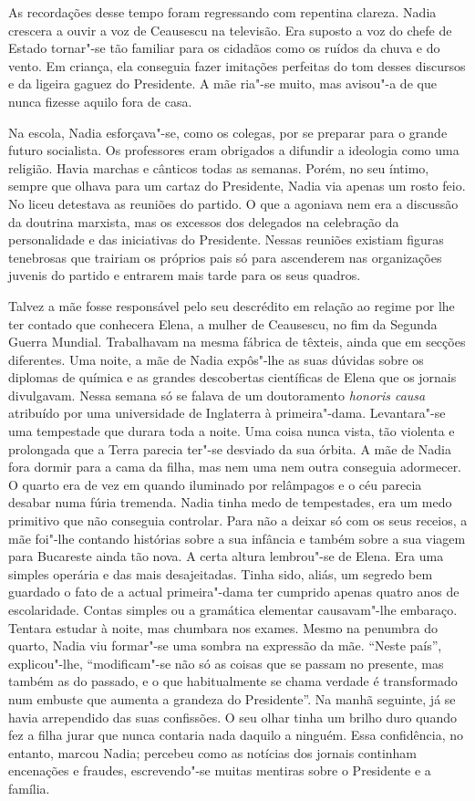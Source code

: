 As recordações desse tempo foram regressando com
repentina clareza. Nadia crescera a ouvir a voz de Ceausescu na
televisão. Era suposto a voz do chefe de Estado tornar"-se tão familiar
para os cidadãos como os ruídos da chuva e do vento. Em criança, ela
conseguia fazer imitações perfeitas do tom desses discursos e da
ligeira gaguez
do Presidente. A mãe ria"-se muito, mas avisou"-a de que nunca fizesse
aquilo fora de casa.

Na escola, Nadia esforçava"-se, como os colegas, por se preparar para o
grande futuro socialista. Os professores eram obrigados a difundir a
ideologia como uma religião. Havia marchas e cânticos todas as semanas.
Porém, no seu íntimo, sempre que olhava para um cartaz do Presidente,
Nadia via apenas um rosto feio. No liceu detestava as reuniões do
partido. O que a agoniava nem era a discussão da doutrina marxista, mas
os excessos dos delegados na celebração da personalidade e das
iniciativas do Presidente. Nessas reuniões existiam figuras tenebrosas
que trairiam os próprios pais só para ascenderem nas organizações
juvenis do partido e entrarem mais tarde para os seus quadros.

Talvez a mãe fosse responsável pelo seu descrédito em relação ao regime
por lhe ter contado que conhecera Elena, a mulher de Ceausescu, no fim
da Segunda Guerra Mundial. Trabalhavam na mesma fábrica de têxteis,
ainda que em secções diferentes. Uma noite, a mãe de Nadia expôs"-lhe as
suas dúvidas sobre os diplomas de química e as grandes descobertas
científicas de Elena que os jornais divulgavam. Nessa semana só se
falava de um doutoramento \emph{honoris causa} atribuído por uma universidade de Inglaterra à
primeira"-dama. Levantara"-se uma tempestade que durara toda a noite. Uma
coisa nunca vista, tão violenta e prolongada que a Terra parecia
ter"-se desviado da sua órbita. A mãe de Nadia fora dormir para a cama da
filha, mas nem uma nem outra conseguia adormecer. O quarto era de vez em
quando iluminado por relâmpagos e o céu parecia desabar numa fúria
tremenda. Nadia tinha medo de tempestades, era um medo primitivo que não conseguia controlar. Para não a
deixar só com os seus receios, a mãe foi"-lhe contando histórias sobre a
sua infância e também sobre a sua viagem para Bucareste ainda tão nova.
A certa altura lembrou"-se de Elena. Era uma simples operária e das mais
desajeitadas. Tinha sido, aliás, um segredo bem guardado o fato de a
actual primeira"-dama ter cumprido apenas quatro anos de escolaridade.
Contas simples ou a gramática elementar causavam"-lhe embaraço. Tentara
estudar à noite, mas chumbara nos exames. Mesmo na penumbra do quarto,
Nadia viu formar"-se uma sombra na expressão da mãe.
``Neste país'', explicou"-lhe, ``modificam"-se não só as coisas que se passam
no presente, mas também as do passado, e o que habitualmente se chama
verdade é transformado num embuste que aumenta a grandeza do
Presidente''. Na manhã seguinte, já se havia arrependido das suas
confissões. O seu olhar tinha um brilho duro quando fez a filha jurar
que nunca contaria nada daquilo a ninguém. Essa confidência, no entanto,
marcou Nadia; percebeu como as notícias dos jornais continham encenações
e fraudes, escrevendo"-se muitas mentiras sobre o Presidente e a
família.

